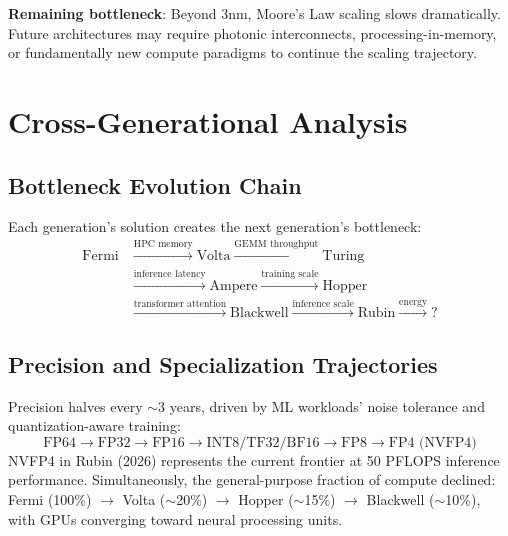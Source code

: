 \documentclass{article}
\begin{document}
\textbf{Remaining bottleneck}: Beyond 3nm, Moore's Law scaling slows dramatically. Future architectures may require photonic interconnects, processing-in-memory, or fundamentally new compute paradigms to continue the scaling trajectory.

\section{Cross-Generational Analysis}

\subsection{Bottleneck Evolution Chain}

Each generation's solution creates the next generation's bottleneck:
\begin{equation}
\begin{aligned}
\text{Fermi} &\xrightarrow{\text{HPC memory}} \text{Volta} \xrightarrow{\text{GEMM throughput}} \text{Turing} \\
&\xrightarrow{\text{inference latency}} \text{Ampere} \xrightarrow{\text{training scale}} \text{Hopper} \\
&\xrightarrow{\text{transformer attention}} \text{Blackwell} \xrightarrow{\text{inference scale}} \text{Rubin} \xrightarrow{\text{energy}} \text{?}
\end{aligned}
\end{equation}

\subsection{Precision and Specialization Trajectories}

Precision halves every $\sim$3 years, driven by ML workloads' noise tolerance and quantization-aware training:
\begin{equation}
\text{FP64} \to \text{FP32} \to \text{FP16} \to \text{INT8/TF32/BF16} \to \text{FP8} \to \text{FP4 (NVFP4)}
\end{equation}
NVFP4 in Rubin (2026) represents the current frontier at 50 PFLOPS inference performance.
Simultaneously, the general-purpose fraction of compute declined: Fermi (100\%) $\to$ Volta ($\sim$20\%) $\to$ Hopper ($\sim$15\%) $\to$ Blackwell ($\sim$10\%), with GPUs converging toward neural processing units.
\end{document}
